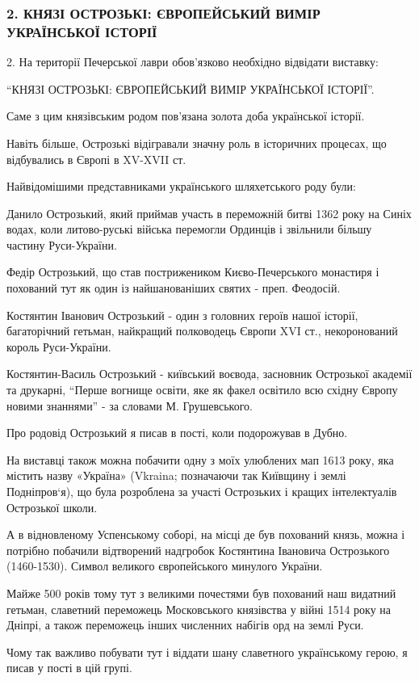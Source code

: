  
 
 
 
 
\subsubsection{2. КНЯЗІ ОСТРОЗЬКІ: ЄВРОПЕЙСЬКИЙ ВИМІР УКРАЇНСЬКОЇ ІСТОРІЇ}

2. На території Печерської лаври обов’язково необхідно відвідати виставку:

\enquote{КНЯЗІ ОСТРОЗЬКІ: ЄВРОПЕЙСЬКИЙ ВИМІР УКРАЇНСЬКОЇ ІСТОРІЇ}.

Саме з цим князівським родом пов’язана золота доба української історії. 

Навіть більше, Острозькі відігравали значну роль в історичних процесах, що
відбувались в Європі в XV-XVII ст. 

Найвідомішими представниками українського шляхетського роду були:

Данило Острозький, який приймав участь в переможній битві 1362 року на Синіх
водах, коли литово-руські війська перемогли Ординців і звільнили більшу частину
Руси-України.

Федір Острозький, що став пострижеником Києво-Печерського монастиря і похований
тут як один із найшанованіших святих - преп. Феодосій.


Костянтин Іванович Острозький - один з головних героїв нашої історії,
багаторічний гетьман, найкращий полководець Європи XVI ст., некоронований
король Руси-України.

Костянтин-Василь Острозький - київський воєвода, засновник Острозької академії
та друкарні, \enquote{Перше вогнище освіти, яке як факел освітило всю східну
Європу новими знаннями} - за словами М. Грушевського.  

Про родовід Острозький я писав в пості, коли подорожував в Дубно.

На виставці також можна побачити одну з моїх улюблених мап 1613 року, яка
містить назву «Україна» (Vkraina; позначаючи так Київщину і землі Подніпров‘я),
що була розроблена за участі Острозьких і кращих інтелектуалів Острозької
школи.

А в відновленому Успенському соборі, на місці де був похований князь, можна і
потрібно побачили відтворений надгробок Костянтина Івановича Острозького
(1460-1530). Символ великого європейського минулого України.

Майже 500 років тому тут з великими почестями був похований наш видатний
гетьман, славетний переможець Московського князівства у війні 1514 року на
Дніпрі, а також переможець інших численних набігів орд на землі Руси.

Чому так важливо побувати тут і віддати шану славетного українському герою, я
писав у пості в цій групі. 

